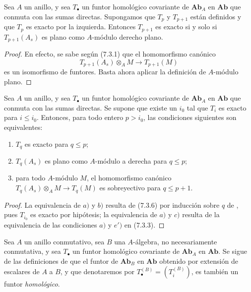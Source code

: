 \begin{lemma}[7.3.6]
\label{III.7.3.6}
Sea $A$ un anillo, y sea $T_\bullet$ un funtor homológico
covariante de $\boldsymbol{Ab}_A$ en $\boldsymbol{Ab}$ que conmuta con las
sumas directas. Supongamos que $T_p$ y $T_{p+1}$ están definidos y
que $T_p$ es exacto por la izquierda. Entonces $T_{p+1}$ es exacto
si y solo si $T_{p+1}(A_s)$ es plano como $A$-módulo derecho plano.
\end{lemma}

\begin{proof}
En efecto, se sabe según (7.3.1) que el homomorfismo canónico \[
  T_{p+1}(A_s)\otimes_A M\longrightarrow T_{p+1}(M)
\]
es un isomorfismo de funtores. Basta ahora aplicar la definición de
$A$-módulo plano.
\end{proof}

\begin{proposition}[7.3.7]
\label{III.7.3.7}
Sea $A$ un anillo, y sea $T_\bullet$ un funtor homológico
covariante de $\boldsymbol{Ab}_A$ en $\boldsymbol{Ab}$ que conmuta con las
sumas directas. Se supone que existe un $i_0$ tal que $T_i$ es
exacto para $i\leq i_0$. Entonces, para todo entero $p>i_0$, las
condiciones siguientes son equivalentes:
\begin{enumerate}
  \item[(a)] $T_q$ es exacto para $q\leq p$;
  \item[(b)] $T_q(A_s)$ es plano como $A$-módulo a derecha para
    $q\leq p$;
  \item[(c)] para todo $A$-módulo $M$, el homomorfismo canónico
    $T_q(A_s)\otimes_A M\longrightarrow T_q(M)$
    es sobreyectivo para $q\leq p+1$.
\end{enumerate}
\end{proposition}

\begin{proof}
La equivalencia de $a)$ y $b)$ resulta de (7.3.6) por inducción sobre $q$ de
, pues $T_{i_0}$ es exacto por hipótesis; la equivalencia de $a)$ y $c)$
resulta de la equivalencia de las condiciones $a)$ y $e')$ en (7.3.3).
\end{proof}


\begin{env}[7.3.8]
\label{III.7.3.8}
Sea $A$ un anillo conmutativo, sea $B$ una $A$-álgebra, no
necesariamente conmutativa, y sea $T_\bullet$ un funtor homológico
covariante de $\boldsymbol{Ab}_A$ en $\boldsymbol{Ab}$. Se sigue de las
definiciones de  que el funtor de $\boldsymbol{Ab}_B$ en
$\boldsymbol{Ab}$ obtenido por extensión de escalares de $A$ a $B$, y que denotaremos por $T_\bullet^{(B)}=(T_i^{(B)})$,
es también un funtor \emph{homológico}.
\end{env}

